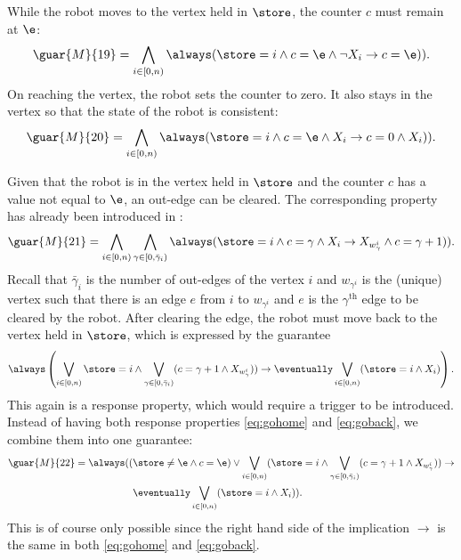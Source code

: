 While the robot moves to the vertex held in $\store$, the counter $c$ must remain at $\e$:
\begin{equation*}
	\guar{M}{19} = \bigwedge_{i \in [0, n)}\always(\store=i \wedge c=\e \wedge \neg X_i \rightarrow \next(c=\e)).
\end{equation*}	
On reaching the vertex, the robot sets the counter to zero. It also stays in the vertex so that the state of the robot is consistent:
\begin{equation*}
	\guar{M}{20} = \bigwedge_{i \in [0, n)}\always(\store=i \wedge c=\e \wedge X_i \rightarrow \next(c=0 \wedge X_i)).
\end{equation*}

Given that the robot is in the vertex held in $\store$ and the counter $c$ has a value not equal to $\e$, an out-edge can be cleared. The corresponding property has already been introduced in :
\begin{equation*}
	\guar{M}{21} = \bigwedge_{i \in [0, n)} \bigwedge_{\gamma \in [0, \bar{\gamma}_i)} \always(\store = i \wedge c = \gamma \wedge X_i \rightarrow \next(X_{w_\gamma^i} \wedge c = \gamma + 1)).
\end{equation*}
Recall that $\bar{\gamma}_i$ is the number of out-edges of the vertex $i$ and $w_{\gamma^i}$ is the (unique) vertex such that there is an edge $e$ from $i$ to $w_{\gamma^i}$ and $e$ is the $\gamma^\mathrm{th}$ edge to be cleared by the robot. After clearing the edge, the robot must move back to the vertex held in $\store$, which is expressed by the guarantee
\begin{equation}
	\always\left(\bigvee_{i \in [0, n)} \store = i \wedge \bigvee_{\gamma \in [0, \bar{\gamma}_i)}(c = \gamma + 1 \wedge X_{w_\gamma^i})) \rightarrow \eventually \bigvee_{i \in [0, n)} (\store = i \wedge X_i)\right).
	\label{eq:goback}
\end{equation}
This again is a response property, which would require a trigger to be introduced. Instead of having both response properties \eqref{eq:gohome} and \eqref{eq:goback}, we combine them into one guarantee:
\begin{align*}
	\guar{M}{22} = \always((&\store\neq\e\wedge c=\e) \vee \bigvee_{i \in [0, n)} (\store = i \wedge \bigvee_{\gamma \in [0, \bar{\gamma}_i)}(c = \gamma + 1 \wedge X_{w_\gamma^i})) \rightarrow \\ &\eventually \bigvee_{i \in [0, n)} (\store = i \wedge X_i)).
\end{align*}
This is of course only possible since the right hand side of the implication $\rightarrow$ is the same in both \eqref{eq:gohome} and \eqref{eq:goback}.\\

